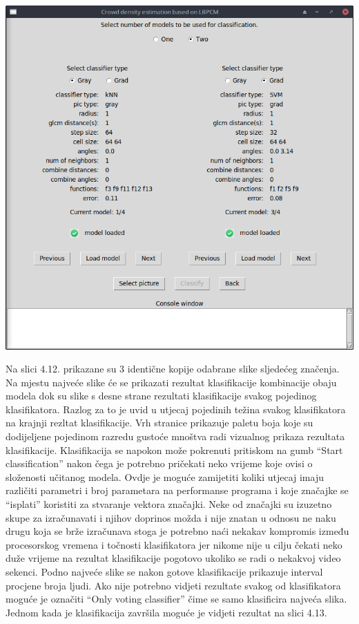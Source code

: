 \documentclass[times, utf8, zavrsni]{fer}
\begin{document}
\begin{minipage}{\linewidth}
\centering
\includegraphics[scale=0.4]{img/cl2.png}
\end{minipage}

\bigbreak

Na slici 4.12. prikazane su 3 identične kopije odabrane slike sljedećeg 
značenja. Na mjestu najveće slike će se prikazati rezultat klasifikacije kombinacije 
obaju modela dok su slike s desne strane rezultati klasifikacije svakog 
pojedinog klasifikatora. 
Razlog za to je uvid u utjecaj pojedinih težina svakog klasifikatora na 
krajnji rezltat klasifikacije. Vrh stranice prikazuje paletu boja koje
su dodijeljene pojedinom razredu gustoće mnoštva radi vizualnog
prikaza rezultata klasifikacije. Klasifikacija se napokon može pokrenuti
pritiskom na gumb \enquote{Start classification} nakon čega je potrebno
pričekati neko vrijeme koje ovisi o složenosti učitanog modela. 
Ovdje je moguće zamijetiti koliki utjecaj imaju različiti parametri i broj parametara 
na performanse programa i koje značajke se \enquote{isplati}
koristiti za stvaranje vektora značajki. Neke od značajki su izuzetno 
skupe za izračunavati i njihov doprinos možda i nije znatan u odnosu 
ne naku drugu koja se brže izračunava stoga je potrebno naći nekakav
kompromis između procesorskog vremena i točnosti klasifikatora jer 
nikome nije u cilju čekati neko duže vrijeme na rezultat klasifikacije pogotovo
ukoliko se radi o nekakvoj video sekenci.
Podno najveće slike se nakon gotove klasifikacije prikazuje interval
procjene broja ljudi. Ako nije potrebno vidjeti rezultate svakog od
klasifikatora moguće je označiti  \enquote{Only voting classifier}
čime se samo klasificira najveća slika. Jednom kada je klasifikacija 
završila moguće je vidjeti rezultat na slici 4.13.
\end{document}
